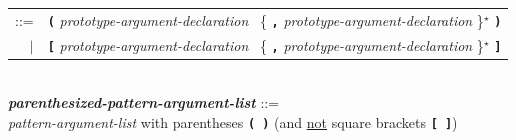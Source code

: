 \documentclass[12pt]{article}
\newcommand{\TT}[1]{{\tt \bfseries #1}}
\newcommand{\STAR}{{\Large $^\star$}}
\newcommand{\emkey}[1]{{\em \bfseries #1}}
\newenvironment{indpar}[1][0.3in]%
	{\begin{list}{}%
		     {\setlength{\itemsep}{0in}%
		      \setlength{\topsep}{0in}%
		      \setlength{\parsep}{1ex}%
		      \setlength{\labelwidth}{#1}%
		      \setlength{\leftmargin}{#1}%
		      \addtolength{\leftmargin}{\labelsep}}%
	 \item}%
	{\end{list}}
\begin{document}
\begin{indpar}[0.1in]
\hspace*{0.5in}
    \begin{tabular}[t]{@{}rl}
    ::= & \TT{(} {\em prototype-argument-declaration}~
	     \{ \TT{,} {\em prototype-argument-declaration} \}\STAR{} \TT{)} \\
    $|$ & \TT{[} {\em prototype-argument-declaration}~
	     \{ \TT{,} {\em prototype-argument-declaration} \}\STAR{} \TT{]} \\
    \end{tabular}
\\[0.5ex]
\emkey{parenthesized-pattern-argument-list}%
    \label{PARENTHESIZED-PATTERN-ARGUMENT-LIST} ::= \\
\hspace*{0.5in}
    {\em pattern-argument-list} with parentheses \TT{(~)}
    (and \underline{not} square brackets \TT{[~]})
\end{indpar}
\end{document}
